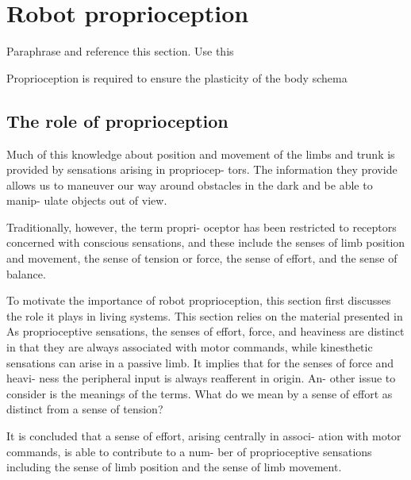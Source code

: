 \section{Robot proprioception}
\TODO Paraphrase and reference this section. Use this \cite{Asada2018168Proprioceptionbodyschema}

Proprioception is required to ensure the plasticity of the body schema \cite{Cardinali2016Proprioceptionisnecessary}

\subsection{The role of proprioception}

Much of
this knowledge about position and movement of the limbs
and trunk is provided by sensations arising in propriocep-
tors. The information they provide allows us to maneuver
our way around obstacles in the dark and be able to manip-
ulate objects out of view.

Traditionally, however, the term propri-
oceptor has been restricted to receptors concerned with
conscious sensations, and these include the senses of limb
position and movement, the sense of tension or force, the
sense of effort, and the sense of balance.

To motivate the importance of robot proprioception, this section first discusses the role it plays in living systems. This section relies on the material presented in 
As proprioceptive sensations, the senses of effort, force, and
heaviness are distinct in that they are always associated with
motor commands, while kinesthetic sensations can arise in a
passive limb. It implies that for the senses of force and heavi-
ness the peripheral input is always reafferent in origin. An-
other issue to consider is the meanings of the terms. What do
we mean by a sense of effort as distinct from a sense of tension?

 It is
concluded that a sense of effort, arising centrally in associ-
ation with motor commands, is able to contribute to a num-
ber of proprioceptive sensations including the sense of limb
position and the sense of limb movement.




